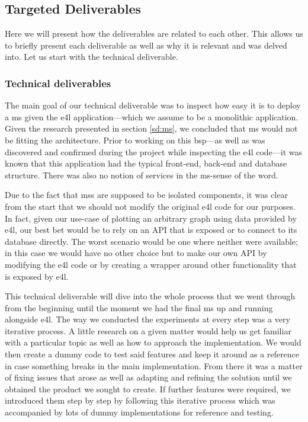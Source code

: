 \subsection{Targeted Deliverables}
\label{sec-deliverables}

Here we will present how the deliverables are related to each other.
This allows us to briefly present each deliverable as well as why it
is relevant and was delved into. Let us start with the technical
deliverable.



\subsubsection{Technical deliverables}

The main goal of our technical deliverable was to inspect how easy it
is to deploy a \gls{ms} given the \gls{e4l} application---which we
assume to be a monolithic application. Given the research presented in
section \vref{sd:ms}, we concluded that \gls{ms} would not be fitting
the architecture. Prior to working on this \gls{bsp}---as well as was
discovered and confirmed during the project while inspecting the
\gls{e4l} code---it was known that this application had the typical
front-end, back-end and database structure. There was also no notion
of services in the \gls{ms}-sense of the word.


Due to the fact that \glspl{ms} are supposed to be isolated
components, it was clear from the start that we should not modify the
original \gls{e4l} code for our purposes. In fact, given our use-case
of plotting an arbitrary graph using data provided by \gls{e4l}, our
best bet would be to rely on an API that is exposed or to connect to
its database directly. The worst scenario would be one where neither
were available; in this case we would have no other choice but
to make our own API by modifying the \gls{e4l} code or by creating a
wrapper around other functionality that is exposed by \gls{e4l}.

This technical deliverable will dive into the whole process that we
went through from the beginning until the moment we had the final
\gls{ms} up and running alongside \gls{e4l}. The way we conducted the
experiments at every step was a very iterative process. A little
research on a given matter would help us get familiar with a
particular topic as well as how to approach the implementation. We
would then create a dummy code to test said features and keep it
around as a reference in case something breaks in the main
implementation. From there it was a matter of fixing issues that arose
as well as adapting and refining the solution until we obtained the
product we sought to create. If further features were required, we
introduced them step by step by following this iterative process which
was accompanied by lots of dummy implementations for reference and
testing.

